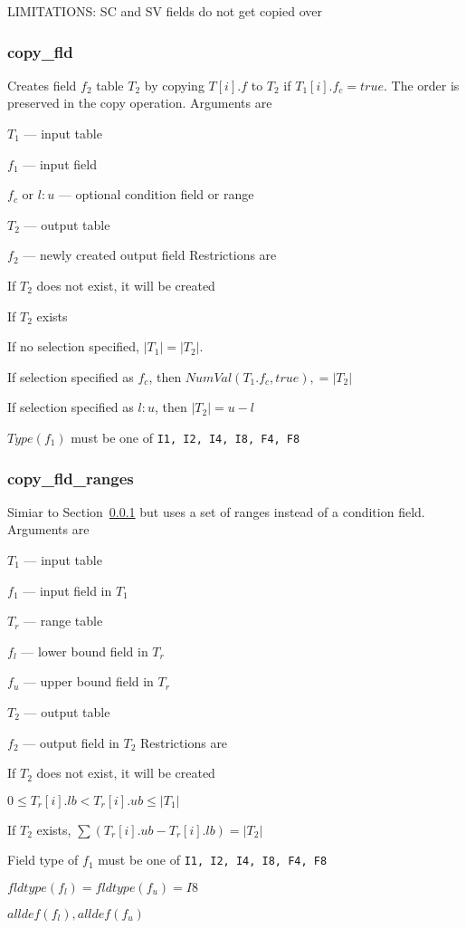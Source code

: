 LIMITATIONS: SC and SV fields do not get copied over


\subsubsection{copy\_fld}
\label{copy_fld}

Creates field \(f_2\) table \(T_2\) by copying
\(T[i].f\) to \(T_2\) if \(T_1[i].f_c = true\). The order is preserved
in the copy operation.
Arguments are
\be
\item \(T_1\) --- input table 
\item \(f_1\) --- input field 
\item \(f_c\) or \(l:u\) --- optional condition field or range 
\item \(T_2\) --- output table 
\item \(f_2\) --- newly created output field 
\ee
Restrictions are
\be
\item If \(T_2\) does not exist, it will be created
\item If \(T_2\) exists
\be
\item If no selection specified, \(|T_1| = |T_2|\). 
\item If selection specified as \(f_c\), then \(NumVal(T_1.f_c, true), = |T_2|\)
\item If selection specified as \(l:u\), then \(|T_2| = u - l\)
\ee
\item \(Type(f_1)\) must be one of {\tt I1, I2, I4, I8, F4, F8}
\ee

\subsubsection{copy\_fld\_ranges}
\label{copy_fld_ranges}

Simiar to Section~\ref{copy_fld} but uses a set of ranges instead of a 
condition field.  Arguments are
\be
\item \(T_1\) --- input table 
\item \(f_1\) --- input field in \(T_1\)
\item \(T_r\) --- range table 
\item \(f_l\) --- lower bound field in \(T_r\)
\item \(f_u\) --- upper bound field in \(T_r\)
\item \(T_2\) --- output table 
\item \(f_2\) --- output field in \(T_2\)
\ee
Restrictions are
\be
\item If \(T_2\) does not exist, it will be created
\item \(0 \leq T_r[i].lb < T_r[i].ub \leq |T_1| \)
\item If \(T_2\) exists, \(\sum (T_r[i].ub - T_r[i].lb) = |T_2|\)
\item Field type of \(f_1\) must be one of {\tt I1, I2, I4, I8, F4, F8}
\item \(fldtype(f_l) = fldtype(f_u) = I8\)
\item \(alldef(f_l), alldef(f_u)\)
\ee

